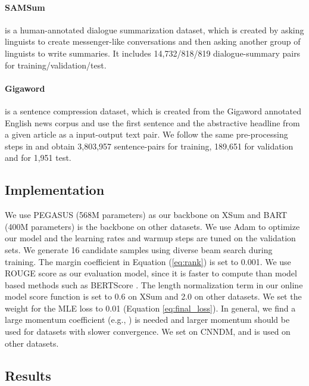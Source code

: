 \documentclass{article}
\begin{document}
\paragraph{SAMSum} is a human-annotated dialogue summarization dataset, which is created by asking linguists to create messenger-like conversations and then asking another group of linguists to write summaries. It includes 14,732/818/819 dialogue-summary pairs for training/validation/test.

\paragraph{Gigaword} is a sentence compression dataset, which is created from the Gigaword annotated English news corpus \cite{napoles2012annotated} and use the first sentence and the abstractive headline from a given article as a input-output text pair. We follow the same pre-processing steps in \cite{rush2015neural} and  obtain 3,803,957 sentence-pairs for training, 189,651 for validation and for 1,951 test.

\subsection{Implementation}
We use PEGASUS \cite{zhang:2019:icml} (568M parameters) as our backbone on XSum and BART \cite{lewis-etal-2020-bart} (400M parameters) is the backbone on other datasets. We use Adam \cite{kingma2014adam} to optimize our model and the learning rates and warmup steps are tuned on the validation sets. We generate 16 candidate samples using diverse beam search \cite{vijayakumar:2016:arxiv} during training. The margin coefficient  in Equation (\ref{eq:rank}) is set to 0.001. We use ROUGE score \cite{lin-2004-rouge} as our evaluation model, since it is faster to compute than model based methods such as BERTScore \cite{zhang2019bertscore}. The length normalization term  in our online model score function is set to 0.6 on XSum and 2.0 on other datasets. We set the weight for the MLE loss  to 0.01 (Equation \ref{eq:final_loss}). In general, we find a large momentum coefficient  (e.g., ) is needed and larger momentum should be used for datasets with slower convergence.
We set  on CNNDM, and  is used on other datasets.

\subsection{Results}
\end{document}
